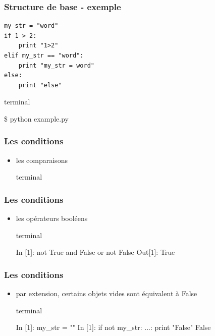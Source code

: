 \begin{frame}[fragile]
  \frametitle{Structure de base - exemple}
  \begin{lstlisting}
my_str = "word"
if 1 > 2:
    print "1>2"
elif my_str == "word":
    print "my_str = word"
else:
    print "else"
  \end{lstlisting}

  \begin{beamercolorbox}{terminal}
  \begin{semiverbatim}
 \$ python example.py
  \end{semiverbatim}
  \end{beamercolorbox}

\end{frame}

\begin{frame}[fragile]
  \frametitle{Les conditions}
  \begin{itemize}
    \item les comparaisons
    \begin{beamercolorbox}{terminal}
    \begin{semiverbatim}

    \end{semiverbatim}
    \end{beamercolorbox}
  \end{itemize}
\end{frame}

\begin{frame}[fragile]
  \frametitle{Les conditions}
  \begin{itemize}
    \item les opérateurs booléens
    \begin{beamercolorbox}{terminal}
    \begin{semiverbatim}
In [1]: not True and False or not False
Out[1]: True
    \end{semiverbatim}
    \end{beamercolorbox}
  \end{itemize}
\end{frame}

\begin{frame}[fragile]
  \frametitle{Les conditions}
  \begin{itemize}
    \item par extension, certains objets vides sont équivalent à False
    \begin{beamercolorbox}{terminal}
    \begin{semiverbatim}
In [1]: my_str = ""
In [1]: if not my_str:
   ...:     print "False"
False
    \end{semiverbatim}
    \end{beamercolorbox}
  \end{itemize}
\end{frame}

